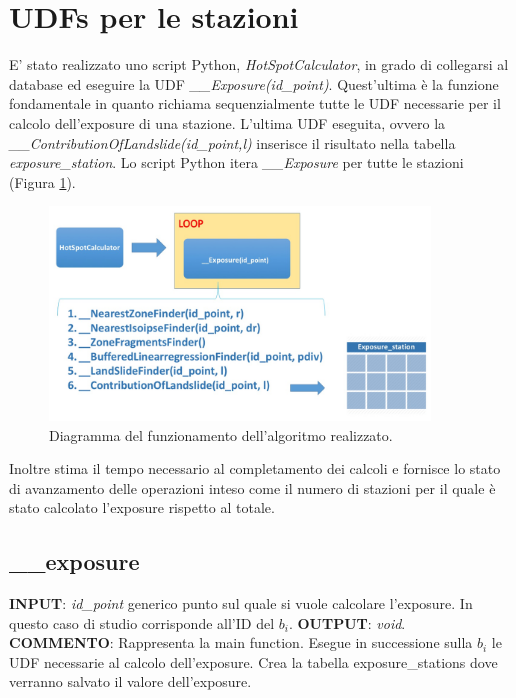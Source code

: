 \section{UDFs per le stazioni}
E' stato realizzato uno script Python, \textit{HotSpotCalculator}, in grado di collegarsi al database ed eseguire la UDF  \textit{\_\_Exposure(id\_point)}. Quest'ultima è la funzione fondamentale in quanto richiama sequenzialmente tutte le UDF necessarie per il calcolo dell'exposure di una stazione. L'ultima UDF eseguita, ovvero la \textit{\_\_ContributionOfLandslide(id\_point,l)} inserisce il risultato nella tabella \textit{exposure\_station}.
Lo script Python itera \textit{\_\_Exposure} per tutte le stazioni (Figura \ref{diagramma_algoritmo}).  

\begin{figure}[h]
	\centering
	\includegraphics[width=0.9\textwidth]{images/algorithm}
	\caption{Diagramma del funzionamento dell'algoritmo realizzato.}
	\label{diagramma_algoritmo}
\end{figure}

Inoltre stima il tempo necessario al completamento dei calcoli e fornisce lo stato di avanzamento delle operazioni inteso come il numero di stazioni per il quale è stato calcolato l'exposure rispetto al totale.



\subsection{\_\_exposure}
\textbf{INPUT}: \textit{id\_point} generico punto sul quale si vuole calcolare l'exposure. In questo caso di studio corrisponde all'ID del $b_i$.\newline
\textbf{OUTPUT}: \textit{void}. \newline
\textbf{COMMENTO}: Rappresenta la main function. Esegue in successione sulla $b_i$ le UDF necessarie al calcolo dell'exposure. Crea la tabella exposure\_stations dove verranno salvato il valore dell'exposure.   

